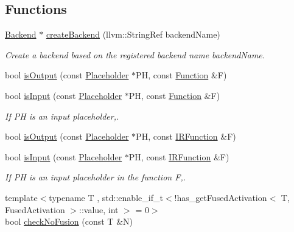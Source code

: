 \subsection*{Functions}
\begin{DoxyCompactItemize}
\item 
\mbox{\label{namespaceglow_a9cd2773ca12798a14e44f6f57c2ee826}} 
\hyperlink{classglow_1_1_backend}{Backend} $\ast$ \hyperlink{namespaceglow_a9cd2773ca12798a14e44f6f57c2ee826}{create\+Backend} (llvm\+::\+String\+Ref backend\+Name)
\begin{DoxyCompactList}\small\item\em Create a backend based on the registered backend name {\ttfamily backend\+Name}. \end{DoxyCompactList}\item 
bool \hyperlink{namespaceglow_af18ed78d6c309a7061f1b1318b9d8aca}{is\+Output} (const \hyperlink{classglow_1_1_placeholder}{Placeholder} $\ast$PH, const \hyperlink{classglow_1_1_function}{Function} \&F)
\item 
bool \hyperlink{namespaceglow_afbc28cae078d0b91e0bda921554f3ae6}{is\+Input} (const \hyperlink{classglow_1_1_placeholder}{Placeholder} $\ast$PH, const \hyperlink{classglow_1_1_function}{Function} \&F)
\begin{DoxyCompactList}\small\item\em If {\ttfamily PH} is an input placeholder,. \end{DoxyCompactList}\item 
bool \hyperlink{namespaceglow_a5a7a54e3291e2de0fa2c08e14cf1f36b}{is\+Output} (const \hyperlink{classglow_1_1_placeholder}{Placeholder} $\ast$PH, const \hyperlink{classglow_1_1_i_r_function}{I\+R\+Function} \&F)
\item 
bool \hyperlink{namespaceglow_acb98192dd9bfc2315759db1806f01ad1}{is\+Input} (const \hyperlink{classglow_1_1_placeholder}{Placeholder} $\ast$PH, const \hyperlink{classglow_1_1_i_r_function}{I\+R\+Function} \&F)
\begin{DoxyCompactList}\small\item\em If {\ttfamily PH} is an input placeholder in the function {\ttfamily F},. \end{DoxyCompactList}\item 
{\footnotesize template$<$typename T , std\+::enable\+\_\+if\+\_\+t$<$!has\+\_\+get\+Fused\+Activation$<$ T, Fused\+Activation $>$\+::value, int $>$  = 0$>$ }\\bool \hyperlink{namespaceglow_ab310f352073eee80ddb68b3cfaa14e12}{check\+No\+Fusion} (const T \&N)

\end{DoxyCompactItemize}
